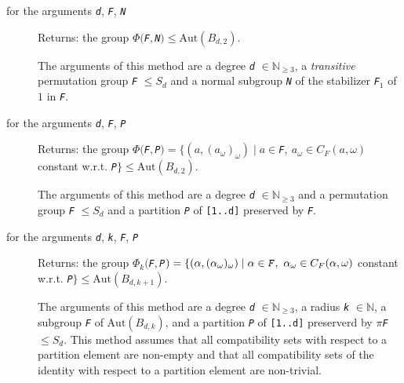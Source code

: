 \documentclass[a4paper,11pt]{report}
\begin{document}
{{{ 

 
\begin{description}
\item[{for the arguments \mbox{\texttt{\mdseries\slshape d}}, \mbox{\texttt{\mdseries\slshape F}}, \mbox{\texttt{\mdseries\slshape N}}}]  Returns: the group $\Phi($\mbox{\texttt{\mdseries\slshape F}}$,$\mbox{\texttt{\mdseries\slshape N}}$)\le\mathrm{Aut}(B_{d,2})$. 

 The arguments of this method are a degree \mbox{\texttt{\mdseries\slshape d}} $\in\mathbb{N}_{\ge 3}$, a \emph{transitive} permutation group \mbox{\texttt{\mdseries\slshape F}} $\le S_{d}$ and a normal subgroup \mbox{\texttt{\mdseries\slshape N}} of the stabilizer \mbox{\texttt{\mdseries\slshape F}}$_{1}$ of $1$ in \mbox{\texttt{\mdseries\slshape F}}. 
\item[{for the arguments \mbox{\texttt{\mdseries\slshape d}}, \mbox{\texttt{\mdseries\slshape F}}, \mbox{\texttt{\mdseries\slshape P}}}]  Returns: the group $\Phi($\mbox{\texttt{\mdseries\slshape F}}$,$\mbox{\texttt{\mdseries\slshape P}}$)=\{(a,(a_{\omega})_{\omega})\mid a\in $\mbox{\texttt{\mdseries\slshape F}}$,\ a_{\omega}\in C_{F}(a,\omega)$ constant w.r.t. \mbox{\texttt{\mdseries\slshape P}}$\}\le\mathrm{Aut}(B_{d,2})$. 

 The arguments of this method are a degree \mbox{\texttt{\mdseries\slshape d}} $\in\mathbb{N}_{\ge 3}$ and a permutation group \mbox{\texttt{\mdseries\slshape F}} $\le S_{d}$ and a partition \mbox{\texttt{\mdseries\slshape P}} of \texttt{[1..d]} preserved by \mbox{\texttt{\mdseries\slshape F}}. 
\item[{for the arguments \mbox{\texttt{\mdseries\slshape d}}, \mbox{\texttt{\mdseries\slshape k}}, \mbox{\texttt{\mdseries\slshape F}}, \mbox{\texttt{\mdseries\slshape P}}}]  Returns: the group $\Phi_{k}($\mbox{\texttt{\mdseries\slshape F}}$,$\mbox{\texttt{\mdseries\slshape P}}$)=\{(\alpha,(\alpha_{\omega})_{\omega})\mid \alpha\in \mbox{\texttt{\mdseries\slshape F}},\ \alpha_{\omega}\in C_{F}(\alpha,\omega)$ constant w.r.t. \mbox{\texttt{\mdseries\slshape P}}$\}\le\mathrm{Aut}(B_{d,k+1})$. 

 The arguments of this method are a degree \mbox{\texttt{\mdseries\slshape d}} $\in\mathbb{N}_{\ge 3}$, a radius \mbox{\texttt{\mdseries\slshape k}} $\in\mathbb{N}$, a subgroup \mbox{\texttt{\mdseries\slshape F}} of $\mathrm{Aut}(B_{d,k})$, and a partition \mbox{\texttt{\mdseries\slshape P}} of \texttt{[1..d]} preserverd by $\pi$\mbox{\texttt{\mdseries\slshape F}} $\le S_{d}$. This method assumes that all compatibility sets with respect to a partition
element are non-empty and that all compatibility sets of the identity with
respect to a partition element are non-trivial. 
\end{description}
 

}}}
\end{document}
